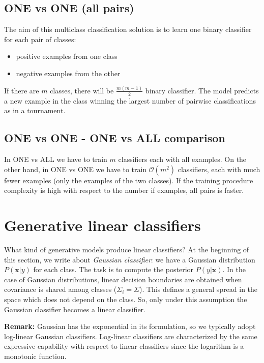 \subsection{ONE vs ONE (all pairs)}
The aim of this multiclass classification solution is to learn one binary
classifier for each pair of classes:
\begin{itemize}
	\item positive examples from one class

	\item negative examples from the other
\end{itemize}
If there are $m$ classes, there will be $\frac{m(m-1)}{2}$ binary classifier. The
model predicts a new example in the class winning the largest number of pairwise
classifications as in a tournament.

\subsection{ONE vs ONE - ONE vs ALL comparison}
In ONE vs ALL we have to train $m$ classifiers each with all examples. On the
other hand, in ONE vs ONE we have to train $\mathcal{O}(m^{2})$ classifiers,
each with much fewer examples (only the examples of the two classes). If the training
procedure complexity is high with respect to the number if examples, all pairs
is faster.

\section{Generative linear classifiers}
What kind of generative models produce linear classifiers? At the beginning of this
section, we write about \textit{Gaussian classifier}: we have a Gaussian
distribution $P(\pmb{x}|y)$ for each class. The task is to compute the posterior
$P(y | \pmb{x})$. In the case of Gaussian distributions, linear decision boundaries
are obtained when covariance is shared among classes ($\Sigma_{i}= \Sigma$).
This defines a general spread in the space which does not depend on the class. So,
only under this assumption the Gaussian classifier becomes a linear classifier.
\newline

\textbf{Remark:} Gaussian has the exponential in its formulation, so we
typically adopt log-linear Gaussian classifiers. Log-linear classifiers are characterized
by the same expressive capability with respect to linear classifiers since the logarithm
is a monotonic function.
\newline

